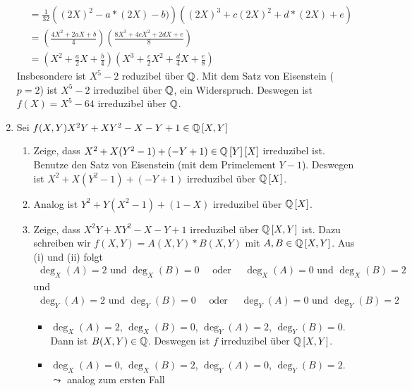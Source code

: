 \begin{exercisePage}
\begin{solution}
\begin{enumerate}[leftmargin=*, label=(\alph*)]
\begin{align*}
                &= \frac{1}{32} \left( (2X)^2 - a* (2X) - b) \right) \left( (2X)^3 + c(2X)^2 + d*(2X) + e \right) \\
                &= \left( \frac{4X^2+2aX+b}{4} \right) \left( \frac{8X^3+4cX^2+2dX+e}{8} \right) \\
                &= \left( X^2 + \frac{a}{2} X + \frac{b}{4} \right) \left( X^3 + \frac{c}{2} X^2 + \frac{d}{4} X + \frac{e}{8} \right)
            \end{align*}
            Insbesondere ist $X^5-2$ reduzibel über $\mathbb{Q}$. Mit dem Satz von Eisenstein ($p=2$) ist $X^5 - 2$ irreduzibel über $\mathbb{Q}$, ein Widerspruch. Deswegen ist $f(X) = X^5 - 64$ irreduzibel über $\mathbb{Q}$.
            \item Sei $f(X,Y)X^2Y + XY^2 - X - Y + 1 \in \mathbb{Q} \left[ X,Y \right]$
            \begin{enumerate}[label=(\roman*)]
                \item Zeige, dass $X^2 + X(Y^2 - 1) + (-Y + 1) \in \mathbb{Q} \left[ Y \right] \left[ X \right]$ irreduzibel ist. Benutze den Satz von Eisenstein (mit dem Primelement $Y-1$). Deswegen ist $X^2 + X(Y^2-1)+(-Y+1)$ irreduzibel über $\mathbb{Q} \left[ X \right]$.
                \item Analog ist $Y^2 + Y(X^2-1)+(1-X)$ irreduzibel über $\mathbb{Q} \left[ X \right]$. 
  \pagebreak
                \item Zeige, dass $X^2Y + XY^2 -X-Y+1$ irreduzibel über $\mathbb{Q} \left[ X,Y \right]$ ist. Dazu schreiben wir $f(X,Y) = A(X,Y) * B(X,Y)$ mit $A,B \in \mathbb{Q} \left[ X,Y \right]$. Aus (i) und (ii) folgt
                \begin{align*}
                    \deg_X(A) = 2 \text{ und } \deg_X(B) = 0 \quad \text{ oder } \quad \deg_X(A) = 0 \text{ und } \deg_X(B) = 2
                \end{align*}
                und
                \begin{align*}
                    \deg_Y(A) = 2 \text{ und } \deg_Y(B) = 0 \quad \text{ oder } \quad \deg_Y(A) = 0 \text{ und } \deg_Y(B) = 2
                \end{align*}
                \begin{itemize}[leftmargin=*]
                    \item $\deg_X(A) = 2$, $\deg_X(B) = 0$, $\deg_Y(A) = 2$, $\deg_Y(B) = 0$. Dann ist $B(X,Y) \in \mathbb{Q}$. Deswegen ist $f$ irreduzibel über $\mathbb{Q} \left[ X,Y \right]$.
                    \item $\deg_X(A) = 0$, $\deg_X(B) = 2$, $\deg_Y(A) = 0$, $\deg_Y(B) = 2$. $\leadsto$ analog zum ersten Fall

\end{itemize}
\end{enumerate}
\end{enumerate}
\end{solution}
\end{exercisePage}
